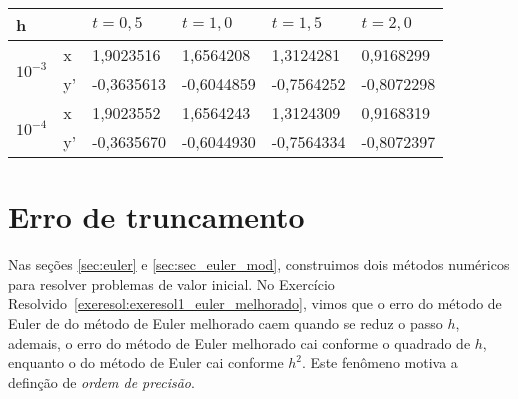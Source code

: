 \begin{resp} \begin{center}
 \begin{tabular}{|l|l|l|l|l|l|}%
\hline
   h&&$t=0,5$&$t=1,0$&$t=1,5$&$t=2,0$\\
   \hline
   \multirow{2}{*}{$10^{-3}$} &x & 1,9023516 &1,6564208&1,3124281&0,9168299\\
		              &y'& -0,3635613&-0,6044859&-0,7564252& -0,8072298\\
   \hline

   \multirow{2}{*}{$10^{-4}$} &x & 1,9023552 & 1,6564243 & 1,3124309 & 0,9168319\\
		              &y'& -0,3635670&-0,6044930&-0,7564334& -0,8072397 \\
   \hline

   \end{tabular}
\end{center}

\end{resp}



\section{Erro de truncamento}\label{sec:erro_truncamento}
Nas seções \ref{sec:euler} e \ref{sec:sec_euler_mod}, construimos dois métodos numéricos para resolver problemas de valor inicial. No Exercício Resolvido~\ref{exeresol:exeresol1_euler_melhorado}, vimos que o erro do método de Euler de do método de Euler melhorado caem quando se reduz o passo $h$, ademais, o erro do método de Euler melhorado cai conforme o quadrado de $h$, enquanto o do método de Euler cai conforme $h^2$. Este fenômeno motiva a definção de \emph{ordem de precisão}.

